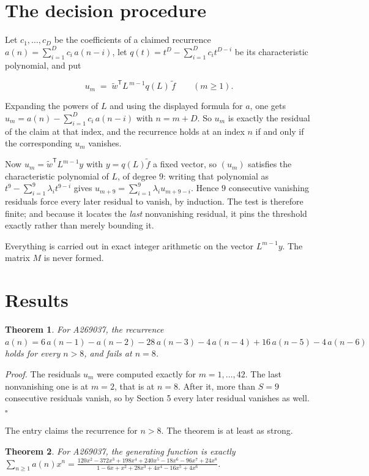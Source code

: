 \documentclass[11pt]{article}
\newtheorem{theorem}{Theorem}
\theoremstyle{definition}
\begin{document}
\section{The decision procedure}

Let $c_1,\dots,c_D$ be the coefficients of a claimed recurrence $a(n) = \sum_{i=1}^{D} c_i\,a(n-i)$, let $q(t) = t^{D} - \sum_{i=1}^{D} c_i t^{D-i}$ be its characteristic polynomial, and put

\[u_m \;=\; \tilde w^{\mathsf T} L^{\,m-1} q(L)\,\tilde f \qquad (m \ge 1).\]

Expanding the powers of $L$ and using the displayed formula for $a$, one gets $u_m = a(n) - \sum_{i=1}^{D} c_i\,a(n-i)$ with $n = m + D$. So $u_m$ is exactly the residual of the claim at that index, and the recurrence holds at an index $n$ if and only if the corresponding $u_m$ vanishes.

Now $u_m = \tilde w^{\mathsf T} L^{m-1} y$ with $y = q(L)\tilde f$ a fixed vector, so $(u_m)$ satisfies the characteristic polynomial of $L$, of degree $9$: writing that polynomial as $t^{9} - \sum_{i=1}^{9} \lambda_i t^{9-i}$ gives $u_{m+9} = \sum_{i=1}^{9} \lambda_i u_{m+9-i}$. Hence $9$ consecutive vanishing residuals force every later residual to vanish, by induction. The test is therefore finite; and because it locates the {\itshape last} nonvanishing residual, it pins the threshold exactly rather than merely bounding it.

Everything is carried out in exact integer arithmetic on the vector $L^{m-1}y$. The matrix $M$ is never formed.

\section{Results}

\begin{theorem} For A269037, the recurrence $a(n) = 6\,a(n-1) - a(n-2) - 28\,a(n-3) - 4\,a(n-4) + 16\,a(n-5) - 4\,a(n-6)$ holds for every $n > 8$, and fails at $n = 8$.\end{theorem}

{\itshape Proof.} The residuals $u_m$ were computed exactly for $m = 1,\dots,42$. The last nonvanishing one is at $m = 2$, that is at $n = 8$. After it, more than $S = 9$ consecutive residuals vanish, so by Section 5 every later residual vanishes as well. $\square$

The entry claims the recurrence for $n > 8$. The theorem is at least as strong.

\begin{theorem} For A269037, the generating function is exactly $\sum_{n\ge 1} a(n)x^n = \frac{120x^{2} - 372x^{3} + 198x^{4} + 240x^{5} - 18x^{6} - 96x^{7} + 24x^{8}}{1 - 6x + x^{2} + 28x^{3} + 4x^{4} - 16x^{5} + 4x^{6}}$.\end{theorem}
\end{document}
